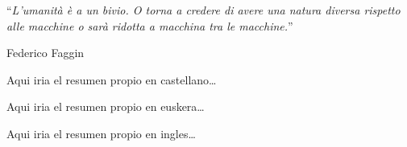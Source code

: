 \documentclass[
11pt, %
spanish, %
singlespacing, %
headsepline, %
]{MastersDoctoralThesis} %
\begin{document}
\let\cleardoublepage\clearpage 


\vspace*{0.2\textheight}

\noindent\enquote{\itshape L'umanità è a un bivio. O torna a credere di avere una natura diversa rispetto alle macchine o sarà ridotta a macchina tra le macchine.}\bigbreak

\hfill Federico Faggin


\begin{Resumen}
\addchaptertocentry{\resumenname} %
Aqui iria el resumen propio en castellano\ldots
\end{Resumen}


\begin{Laburpena}
\addchaptertocentry{\resumennameeus} %
Aqui iria el resumen propio en euskera\ldots
\end{Laburpena}


\begin{Abstract}
\addchaptertocentry{\resumennamein} %
Aqui iria el resumen propio en ingles\ldots
\end{Abstract}


\tableofcontents %
\addchaptertocentry{\contentsname}  %
\listoffigures %
\addchaptertocentry{\listfigurename} %
\listoftables %
\addchaptertocentry{\listtablename} %
\end{document}
